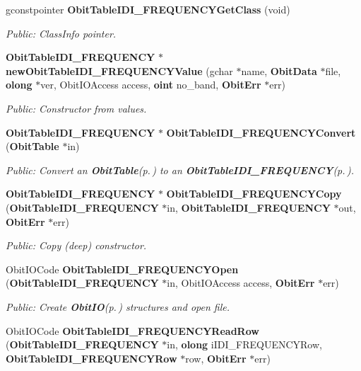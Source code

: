 \begin{CompactItemize}
gconstpointer {\bf Obit\-Table\-IDI\_\-FREQUENCYGet\-Class} (void)
\begin{CompactList}\small\item\em Public: Class\-Info pointer. \item\end{CompactList}\item 
{\bf Obit\-Table\-IDI\_\-FREQUENCY} $\ast$ {\bf new\-Obit\-Table\-IDI\_\-FREQUENCYValue} (gchar $\ast$name, {\bf Obit\-Data} $\ast$file, {\bf olong} $\ast$ver, Obit\-IOAccess access, {\bf oint} no\_\-band, {\bf Obit\-Err} $\ast$err)
\begin{CompactList}\small\item\em Public: Constructor from values. \item\end{CompactList}\item 
{\bf Obit\-Table\-IDI\_\-FREQUENCY} $\ast$ {\bf Obit\-Table\-IDI\_\-FREQUENCYConvert} ({\bf Obit\-Table} $\ast$in)
\begin{CompactList}\small\item\em Public: Convert an {\bf Obit\-Table}{\rm (p.\,\pageref{structObitTable})} to an {\bf Obit\-Table\-IDI\_\-FREQUENCY}{\rm (p.\,\pageref{structObitTableIDI__FREQUENCY})}. \item\end{CompactList}\item 
{\bf Obit\-Table\-IDI\_\-FREQUENCY} $\ast$ {\bf Obit\-Table\-IDI\_\-FREQUENCYCopy} ({\bf Obit\-Table\-IDI\_\-FREQUENCY} $\ast$in, {\bf Obit\-Table\-IDI\_\-FREQUENCY} $\ast$out, {\bf Obit\-Err} $\ast$err)
\begin{CompactList}\small\item\em Public: Copy (deep) constructor. \item\end{CompactList}\item 
Obit\-IOCode {\bf Obit\-Table\-IDI\_\-FREQUENCYOpen} ({\bf Obit\-Table\-IDI\_\-FREQUENCY} $\ast$in, Obit\-IOAccess access, {\bf Obit\-Err} $\ast$err)
\begin{CompactList}\small\item\em Public: Create {\bf Obit\-IO}{\rm (p.\,\pageref{structObitIO})} structures and open file. \item\end{CompactList}\item 
Obit\-IOCode {\bf Obit\-Table\-IDI\_\-FREQUENCYRead\-Row} ({\bf Obit\-Table\-IDI\_\-FREQUENCY} $\ast$in, {\bf olong} i\-IDI\_\-FREQUENCYRow, {\bf Obit\-Table\-IDI\_\-FREQUENCYRow} $\ast$row, {\bf Obit\-Err} $\ast$err)

\end{CompactItemize}
